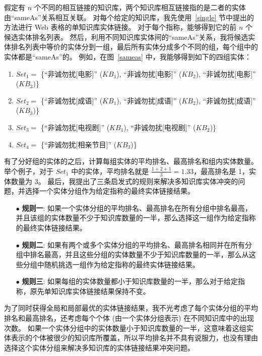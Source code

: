 假定有 $n$ 个不同的相互链接的知识库，两个知识库相互链接指的是二者的实体由``sameAs''关系相互关联。
对每个给定的知识库，我先使用~\ref{single} 节中提出的方法进行 Web 表格的单知识库实体链接。
对于每个指称，能够得到它的前 $n$ 个候选实体排名列表。
然后，利用不同知识库实体间的``sameAs''关系，我将候选实体排名列表中等价的实体分到一组，最后所有实体分成多个不同的组，每个组中的实体都是``sameAs''的。
例如，在图~\ref{sameas} 中，我能够得到如下的四组实体：
\begin{enumerate}[1)]
\item $Set_1=$ \{``非诚勿扰[电影]'' ($KB_1$), ``非诚勿扰[电影]'' ($KB_2$), ``非诚勿扰[电影]'' ($KB_3$)\}
\item $Set_2=$ \{``非诚勿扰[成语]'' ($KB_1$), ``非诚勿扰[成语]'' ($KB_2$), ``非诚勿扰[成语]'' ($KB_3$)\}
\item $Set_3=$ \{``非诚勿扰[电视剧]'' ($KB_1$), ``非诚勿扰[电视剧]'' ($KB_2$)\}
\item $Set_4=$ \{``非诚勿扰[相亲节目]'' ($KB_3$)\}
\end{enumerate}
有了分好组的实体的之后，计算每组实体的平均排名、最高排名和组内实体数量。
举个例子，对于 $Set_1$ 中的实体，平均排名就是 $\frac{1+2+1}{3}=1.33$，最高排名是 1，实体数量为 3。
最后，我提出了三条启发式的规则来解决多知识库实体冲突的问题，并选择一个实体分组作为给定指称的最终实体链接结果。
\begin{itemize}
  \item[$\bullet$] \textbf{规则一}: 如果一个实体分组的平均排名、最高排名在所有分组中排名最高，并且该组的实体数量不少于知识库数量的一半，那么选择这一组作为给定指称的最终实体链接结果。
  \item[$\bullet$] \textbf{规则二}: 如果有两个或多个实体分组的平均排名、最高排名相同并在所有分组中排名最高，并且这些分组的实体数量不少于知识库数量的一半，那么从这些分组中随机挑选一组作为给定指称的最终实体链接结果。
  \item[$\bullet$] \textbf{规则三}: 如果每组的实体数量都小于知识库数量的一半，那么对于给定指称，原先单知识库实体链接结果保持不变。
\end{itemize}
为了同时获得全局和局部最优的实体链接结果，我不光考虑了每个实体分组的平均排名和最高排名，还考虑每个个体 (由一个实体分组表示) 在不同知识库中的出现次数。
如果一个实体分组中的实体数量小于知识库数量的一半，这意味着这组实体表示的个体被很少的知识库所覆盖，所以平均排名并不具有说服力，也没有理由选择这个实体分组来解决多知识库的实体链接结果冲突问题。


